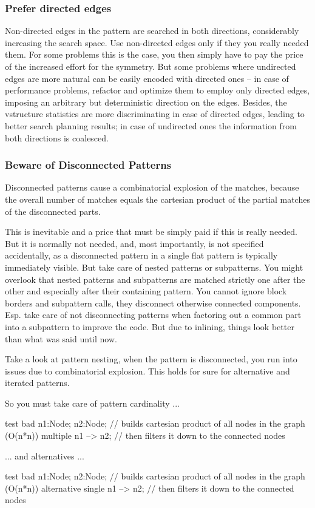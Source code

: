 \subsubsection*{Prefer directed edges}
Non-directed edges in the pattern are searched in both directions, considerably increasing the search space.
Use non-directed edges only if they you really needed them.
For some problems this is the case, you then simply have to pay the price of the increased effort for the symmetry.
But some problems where undirected edges are more natural can be easily encoded with directed ones -- in case of performance problems, refactor and optimize them to employ only directed edges, imposing an arbitrary but deterministic direction on the edges.
Besides, the vstructure statistics are more discriminating in case of directed edges, leading to better search planning results; in case of undirected ones the information from both directions is coalesced.


\subsubsection*{Beware of Disconnected Patterns}
Disconnected patterns cause a combinatorial explosion of the matches, because the overall number of matches equals the cartesian product of the partial matches of the disconnected parts. 

This is inevitable and a price that must be simply paid if this is really needed.
But it is normally not needed, and, most importantly, is not specified accidentally, as a disconnected pattern in a single flat pattern is typically immediately visible.
But take care of nested patterns or subpatterns.
You might overlook that nested patterns and subpatterns are matched strictly one after the other and especially after their containing pattern.
You cannot ignore block borders and subpattern calls, they disconnect otherwise connected components.
Esp. take care of not disconnecting patterns when factoring out a common part into a subpattern to improve the code.
But due to inlining, things look better than what was said until now.

\begin{example}
Take a look at pattern nesting, when the pattern is disconnected, you run into issues due to combinatorial explosion.
This holds for sure for alternative and iterated patterns.

So you must take care of pattern cardinality ...
\begin{grgen}
test bad {
  n1:Node; n2:Node; // builds cartesian product of all nodes in the graph (O(n*n))
  multiple {
    n1 --> n2; // then filters it down to the connected nodes
  }
}
\end{grgen}
... and alternatives ...
\begin{grgen}
test bad {
  n1:Node; n2:Node; // builds cartesian product of all nodes in the graph (O(n*n))
  alternative {
    single {
      n1 --> n2; // then filters it down to the connected nodes
    }
  }
}
\end{grgen}
\end{example}

